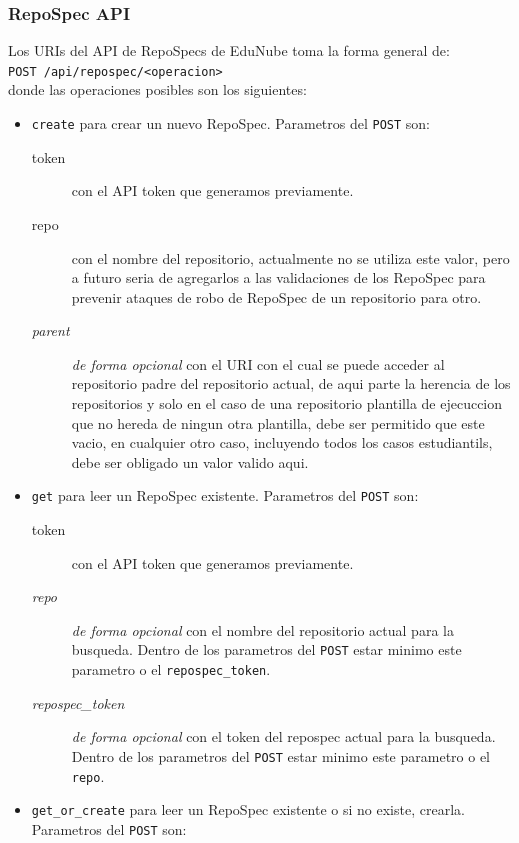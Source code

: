 \subsubsection{RepoSpec API}
Los URIs del API de RepoSpecs de EduNube toma la forma general de: \\
\texttt{POST /api/repospec/<operacion>} \\
donde las operaciones posibles son los siguientes:
\begin{itemize}
	\item \texttt{create} para crear un nuevo RepoSpec. Parametros del \texttt{POST} son:
    \begin{description}
    	\item[token] con el API token que generamos previamente.
        \item[repo] con el nombre del repositorio, actualmente no se utiliza este valor, pero a futuro seria de agregarlos a las validaciones de los RepoSpec para prevenir ataques de robo de RepoSpec de un repositorio para otro.
        \item[\textit{parent}] \textit{de forma opcional} con el URI con el cual se puede acceder al repositorio padre del repositorio actual, de aqui parte la herencia de los repositorios y solo en el caso de una repositorio plantilla de ejecuccion que no hereda de ningun otra plantilla, debe ser permitido que este vacio, en cualquier otro caso, incluyendo todos los casos estudiantils, debe ser obligado un valor valido aqui.
    \end{description}
    \item \texttt{get} para leer un RepoSpec existente. Parametros del \texttt{POST} son:
    \begin{description}
    	\item[token] con el API token que generamos previamente.
        \item[\textit{repo}] \textit{de forma opcional} con el nombre del repositorio actual para la busqueda. Dentro de los parametros del \texttt{POST} estar minimo este parametro o el \texttt{repospec\_token}.
        \item[\textit{repospec\_token}] \textit{de forma opcional} con el token del repospec actual para la busqueda. Dentro de los parametros del \texttt{POST} estar minimo este parametro o el \texttt{repo}.
    \end{description}
    \item \texttt{get\_or\_create} para leer un RepoSpec existente o si no existe, crearla. Parametros del \texttt{POST} son:

\end{itemize}
